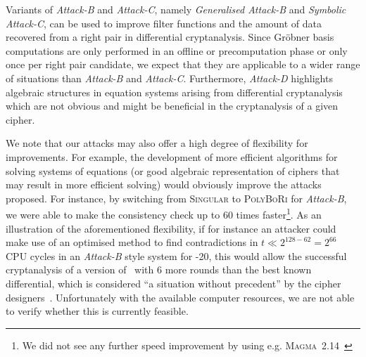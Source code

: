 Variants of \emph{Attack-B} and \emph{Attack-C}, namely \emph{Generalised Attack-B} and \emph{Symbolic Attack-C}, can be used to improve filter functions and the amount of data recovered from a right pair in differential cryptanalysis. Since Gröbner basis computations are only performed in an offline or precomputation phase or only once per right pair candidate, we expect that they are applicable to a wider range of situations than \emph{Attack-B} and \emph{Attack-C}. Furthermore, \emph{Attack-D} highlights algebraic structures in equation systems arising from differential cryptanalysis which are not obvious and might be beneficial in the cryptanalysis of a given cipher.

We note that our attacks may also offer a high degree of flexibility for improvements. For example, the development of more efficient algorithms for
solving systems of equations (or good algebraic representation of ciphers that may result in more efficient solving) would obviously improve the attacks
proposed. For instance, by switching from \textsc{Singular} to \textsc{PolyBoRi} for \emph{Attack-B}, we were able to make the consistency check up to $60$ times faster\footnote{We did not see any further speed improvement by using e.g. \textsc{Magma}~2.14~\cite{magma}}. As an illustration of the aforementioned flexibility, if for instance an attacker could make use of an optimised method to find contradictions in $t \ll 2^{128-62} = 2^{66}$ CPU cycles in an \emph{Attack-B} style system for -20, this would allow the successful cryptanalysis of a version of \PRESENT\ with 6 more rounds than the best known differential, which is considered ``a situation without precedent'' by the cipher designers~\cite{present}. Unfortunately with the available computer resources, we are not able to verify whether this is currently feasible.
